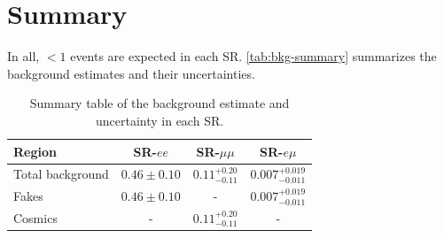 \section{Summary}

In all, $<1$ events are expected in each \ac{SR}. \autoref{tab:bkg-summary} summarizes the background estimates and their uncertainties.

\begin{table}
\centering
\begin{tabular}{lccc}
Region 			 & SR-$ee$ 			& SR-$\mu\mu$ 				& SR-$e\mu$ \\
\hline
Total background & $0.46 \pm 0.10$ 	& $0.11 ^{+0.20}_{-0.11}$	& $0.007^{+0.019}_{-0.011}$\\
\hline
Fakes 			 & $0.46 \pm 0.10$ 	& - 						& $0.007^{+0.019}_{-0.011}$\\
Cosmics 		 & - 				& $0.11 ^{+0.20}_{-0.11}$ 	& - \\
\hline
\end{tabular}
\caption{Summary table of the background estimate and uncertainty in each \ac{SR}.}
\label{tab:bkg-summary}
\end{table}





